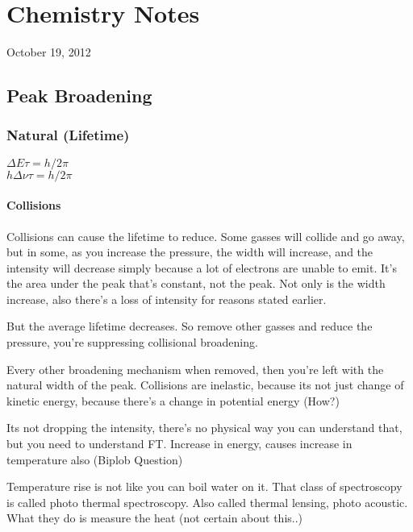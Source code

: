 \chapter{Chemistry Notes}
\begin{flushright}
October 19, 2012
\end{flushright}
\section{Peak Broadening}
	\subsection{Natural (Lifetime)}
		$\Delta E \tau = h/2\pi$ \\
		$h \Delta \nu \tau = h/2\pi$

	\subsubsection{Collisions}
		Collisions can cause the lifetime to reduce. Some gasses will collide and go away, but in some, as you increase the pressure, the width will increase, and the intensity will decrease simply because a lot of electrons are unable to emit. It's the area under the peak that's constant, not the peak. Not only is the width increase, also there's a loss of intensity for reasons stated earlier.
		\par
		But the average lifetime decreases. So remove other gasses and reduce the pressure, you're suppressing collisional broadening.
		\par
		Every other broadening mechanism when removed, then you're left with the natural width of the peak. Collisions are inelastic, because its not just change of kinetic energy, because there's a change in potential energy (How?)
		\par
		Its not dropping the intensity, there's no physical way you can understand that, but you need to understand FT. Increase in energy, causes increase in temperature also (Biplob Question)
		\par
		Temperature rise is not like you can boil water on it. That class of spectroscopy is called photo thermal spectroscopy. Also called thermal lensing, photo acoustic. What they do is measure the heat (not certain about this..)

